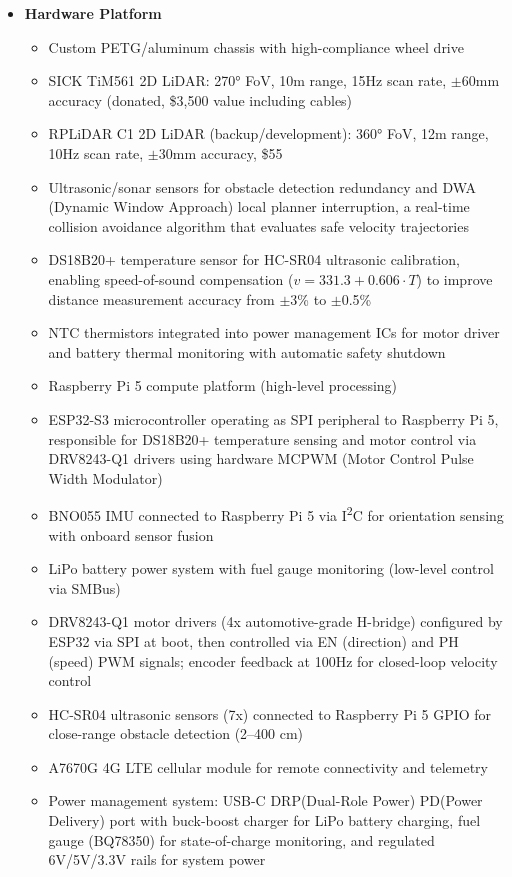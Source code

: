 \begin{itemize}
    \item \textbf{Hardware Platform}
    \begin{itemize}
        \item Custom PETG/aluminum chassis with high-compliance wheel drive
        \item SICK TiM561 2D LiDAR: 270° FoV, 10m range, 15Hz scan rate, $\pm$60mm accuracy (donated, \$3,500 value including cables)
        \item RPLiDAR C1 2D LiDAR (backup/development): 360° FoV, 12m range, 10Hz scan rate, $\pm$30mm accuracy, \$55
        \item Ultrasonic/sonar sensors for obstacle detection redundancy and DWA (Dynamic Window Approach) local planner interruption, a real-time collision avoidance algorithm that evaluates safe velocity trajectories
        \item DS18B20+ temperature sensor for HC-SR04 ultrasonic calibration, enabling speed-of-sound compensation ($v = 331.3 + 0.606 \cdot T$) to improve distance measurement accuracy from $\pm$3\% to $\pm$0.5\%
        \item NTC thermistors integrated into power management ICs for motor driver and battery thermal monitoring with automatic safety shutdown
        \item Raspberry Pi 5 compute platform (high-level processing)
        \item ESP32-S3 microcontroller operating as SPI peripheral to Raspberry Pi 5, responsible for DS18B20+ temperature sensing and motor control via DRV8243-Q1 drivers using hardware MCPWM (Motor Control Pulse Width Modulator)
        \item BNO055 IMU connected to Raspberry Pi 5 via I\textsuperscript{2}C for orientation sensing with onboard sensor fusion
        \item LiPo battery power system with fuel gauge monitoring (low-level control via SMBus)
        \item DRV8243-Q1 motor drivers (4x automotive-grade H-bridge) configured by ESP32 via SPI at boot, then controlled via EN (direction) and PH (speed) PWM signals; encoder feedback at 100Hz for closed-loop velocity control
        \item HC-SR04 ultrasonic sensors (7x) connected to Raspberry Pi 5 GPIO for close-range obstacle detection (2--400 cm)
        \item A7670G 4G LTE cellular module for remote connectivity and telemetry
        \item Power management system: USB-C DRP(Dual-Role Power) PD(Power Delivery) port with buck-boost charger for LiPo battery charging, fuel gauge (BQ78350) for state-of-charge monitoring, and regulated 6V/5V/3.3V rails for system power
    \end{itemize}


\end{itemize}
